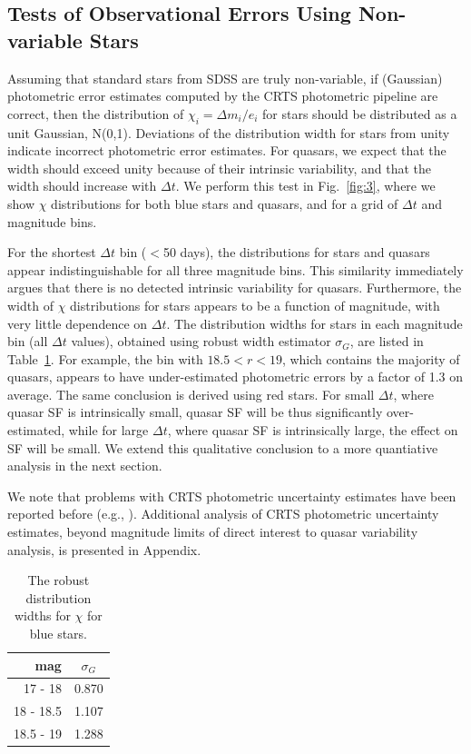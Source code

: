 \documentclass[fleqn,usenatbib]{mnras}  %
\begin{document}
\subsection{Tests of Observational Errors Using Non-variable Stars}
\label{sec:results}

Assuming that standard stars from SDSS are truly non-variable, if (Gaussian) photometric error estimates 
computed by the CRTS photometric pipeline are correct, then the distribution of $\chi_i= \Delta m_i / e_i$ 
for stars should be distributed as a unit Gaussian, N(0,1). Deviations of the distribution width for stars 
from unity indicate incorrect photometric error estimates. For quasars, we expect that the width should
exceed unity because of their intrinsic variability, and that the width should increase with $\Delta t$. 
We perform this test in Fig.~\ref{fig:3}, where we show $\chi$ distributions for both blue stars and quasars, 
and for a grid of $\Delta t$ and magnitude bins. 

For the shortest $\Delta t$ bin ($<$50 days), the distributions for stars and quasars appear indistinguishable
for all three magnitude bins. This similarity immediately argues that there is no detected intrinsic variability
for quasars. Furthermore, the width of $\chi$ distributions for stars appears to be a function of magnitude,
with very little dependence on $\Delta t$. The distribution widths for stars in each magnitude bin (all $\Delta t$
values), obtained using robust width estimator $\sigma_G$, are listed in Table~\ref{tab:fc}. For example,
the bin with $18.5<r<19$, which contains the majority of quasars, appears to have under-estimated photometric
errors by a factor of 1.3 on average. The same conclusion is derived using red stars. For small $\Delta t$, where 
quasar SF is intrinsically small, quasar SF will be thus significantly over-estimated, while for large $\Delta t$, 
where quasar SF is intrinsically large, the effect on SF will be small. We extend this qualitative conclusion 
to a more quantiative analysis in the next section. 

We note that problems with CRTS photometric uncertainty estimates have been reported before
(e.g., \citealt{vaughan2016}). Additional analysis of CRTS photometric uncertainty estimates, beyond magnitude
limits of direct interest to quasar variability analysis, is presented in Appendix. 

\begin{table}
\centering
\caption{The robust distribution widths for $\chi$ for blue stars.}
\label{tab:fc}
\begin{tabular}{ r|c } 
\hline
 mag    & $\sigma_G$ \\ 
 \hline
17   - 18    & 0.870   \\
18   - 18.5 & 1.107   \\
18.5 - 19   & 1.288   
\end{tabular}
\end{table}
\end{document}
